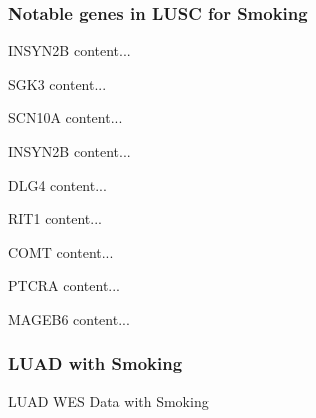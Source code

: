\documentclass{beamer}
\begin{document}
    \begin{frame}[allowframebreaks]
        \frametitle{Notable genes in LUSC for Smoking}

        \begin{block}{INSYN2B}
            content...
        \end{block}

        \begin{block}{SGK3}
            content...
        \end{block}

        \begin{block}{SCN10A}
            content...
        \end{block}

        \begin{block}{INSYN2B}
            content...
        \end{block}

        \begin{block}{DLG4}
            content...
        \end{block}

        \begin{block}{RIT1}
            content...
        \end{block}

        \begin{block}{COMT}
            content...
        \end{block}

        \begin{block}{PTCRA}
            content...
        \end{block}

        \begin{block}{MAGEB6}
            content...
        \end{block}
    \end{frame}

    \begin{frame}
        \frametitle{LUAD with Smoking}

        \begin{table}
            \caption{LUAD WES Data with Smoking}
            \resizebox{!}{0.3 \textheight}
            {}
        \end{table}
    \end{frame}
\end{document}
